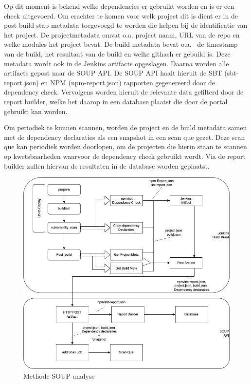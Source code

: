 Op dit moment is bekend welke dependencies er gebruikt worden en is er een check uitgevoerd. Om erachter te komen voor welk project dit is dient er in de post build stap metadata toegevoegd te worden die helpen bij de identificatie van het project. De projectmetadata omvat o.a. project naam, URL van de repo en welke modules het project bevat. De build metadata bevat o.a. \ de timestamp van de build, het resultaat van de build en welke githash er gebuild is. Deze metadata wordt ook in de Jenkins artifacts opgeslagen. Daarna worden alle artifacts gepost naar de SOUP API.
De SOUP API haalt hieruit de SBT (sbt-report.json) en NPM (npm-report.json) rapporten gegenereerd door de dependency check. Vervolgens worden hieruit de relevante data gefilterd door de report builder, welke het daarop in een database plaatst die door de portal gebruikt kan worden.


Om periodiek te kunnen scannen, worden de project en de build metadata samen met de dependency declaraties als een snapshot in een scan que gezet. Deze scan que kan periodiek worden doorlopen, om de projecten die hierin staan te scannen op kwetsbaarheden waarvoor de dependency check gebruikt wordt. Via de report builder zullen hiervan de resultaten in de database worden geplaatst.

\begin{figure}
    \centering
    \includegraphics[width=15cm]{gfx/methode_Jenkins}
    \caption{Methode SOUP analyse}
    \label{fig:methodeSOUPanalyse}
\end{figure}

